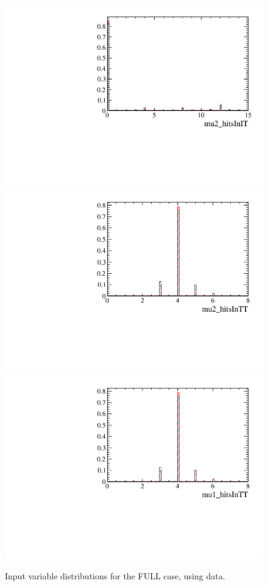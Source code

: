 \begin{figure} [htb!]
\begin{center}
\includegraphics[scale=0.20]{figs/mu2_hitsInITFULL2pipi.pdf}
\includegraphics[scale=0.20]{figs/mu2_hitsInTTFULL2pipi.pdf}
\includegraphics[scale=0.20]{figs/mu1_hitsInTTFULL2pipi.pdf}
\caption{Input variable distributions for the FULL case, using \Kspipi data. \label{fig:MVAhistos_FULL2pipi1}}
\end{center}
\end{figure}


